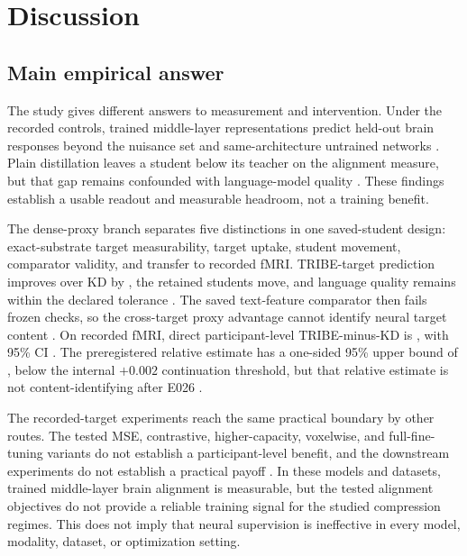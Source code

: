 \section{Discussion}

\subsection{Main empirical answer}

The study gives different answers to measurement and intervention.
Under the recorded controls, trained middle-layer representations predict held-out brain responses beyond the nuisance set and same-architecture untrained networks .
Plain distillation leaves a student below its teacher on the alignment measure, but that gap remains confounded with language-model quality .
These findings establish a usable readout and measurable headroom, not a training benefit.

The dense-proxy branch separates five distinctions in one saved-student design: exact-substrate target measurability, target uptake, student movement, comparator validity, and transfer to recorded fMRI.
TRIBE-target prediction improves over KD by , the retained students move, and language quality remains within the declared tolerance .
The saved text-feature comparator then fails  frozen checks, so the cross-target proxy advantage cannot identify neural target content .
On recorded fMRI, direct participant-level TRIBE-minus-KD is , with 95\% CI .
The preregistered relative estimate has a one-sided 95\% upper bound of , below the internal $+0.002$ continuation threshold, but that relative estimate is not content-identifying after E026 .

The recorded-target experiments reach the same practical boundary by other routes.
The tested MSE, contrastive, higher-capacity, voxelwise, and full-fine-tuning variants do not establish a participant-level benefit, and the downstream experiments do not establish a practical payoff .
In these models and datasets, trained middle-layer brain alignment is measurable, but the tested alignment objectives do not provide a reliable training signal for the studied compression regimes.
This does not imply that neural supervision is ineffective in every model, modality, dataset, or optimization setting.

